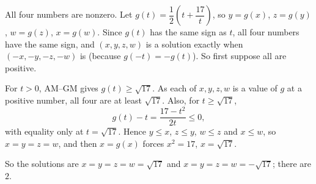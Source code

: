 All four numbers are nonzero. Let $g(t)=\dfrac{1}{2}\left(t+\dfrac{17}{t}\right)$, so $y=g(x)$, $z=g(y)$, $w=g(z)$, $x=g(w)$. Since $g(t)$ has the same sign as $t$, all four numbers have the same sign, and $(x,y,z,w)$ is a solution exactly when $(-x,-y,-z,-w)$ is (because $g(-t)=-g(t)$). So first suppose all are positive.

For $t>0$, AM--GM gives $g(t)\ge\sqrt{17}$. As each of $x,y,z,w$ is a value of $g$ at a positive number, all four are at least $\sqrt{17}$. Also, for $t\ge\sqrt{17}$,
\[
g(t)-t=\dfrac{17-t^2}{2t}\le0,
\]
with equality only at $t=\sqrt{17}$. Hence $y\le x$, $z\le y$, $w\le z$ and $x\le w$, so $x=y=z=w$, and then $x=g(x)$ forces $x^2=17$, $x=\sqrt{17}$.

So the solutions are $x=y=z=w=\sqrt{17}$ and $x=y=z=w=-\sqrt{17}$; there are $\boxed{2}$.
